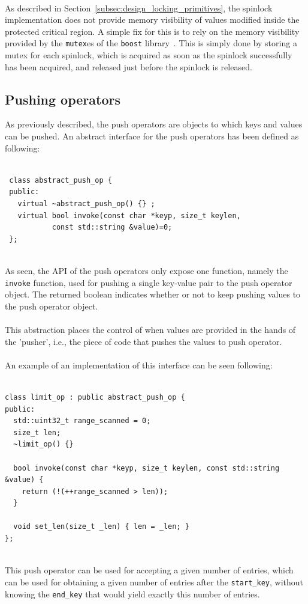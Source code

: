\documentclass[11pt]{report} %
\begin{document}
\\
As described in Section~\ref{subsec:design_locking_primitives}, the spinlock implementation does not provide memory visibility of values modified inside the protected critical region. A simple fix for this is to rely on the memory visibility provided by the \verb|mutex|es of the \verb|boost| library~\cite{boost_mutex}. This is simply done by storing a mutex for each spinlock, which is acquired as soon as the spinlock successfully has been acquired, and released just before the spinlock is released.

\subsection{Pushing operators}
\label{subsec:implementation_pushing_operators}
As previously described, the push operators are objects to which keys and values can be pushed. An abstract interface for the push operators has been defined as following: \\
\\
\begin{fminipage}{\textwidth}
\begin{lstlisting}
 class abstract_push_op {
 public:
   virtual ~abstract_push_op() {} ;
   virtual bool invoke(const char *keyp, size_t keylen,
           const std::string &value)=0;
 };
\end{lstlisting}
\end{fminipage}
\vphantom{fill}\\
As seen, the API of the push operators only expose one function, namely the \verb|invoke| function, used for pushing a single key-value pair to the push operator object. The returned boolean indicates whether or not to keep pushing values to the push operator object. \\
\\
This abstraction places the control of when values are provided in the hands of the 'pusher', i.e., the piece of code that pushes the values to push operator.\\
\\
An example of an implementation of this interface can be seen following:\\
\\
\begin{fminipage}{\textwidth}
\begin{lstlisting}
class limit_op : public abstract_push_op {
public:
  std::uint32_t range_scanned = 0;
  size_t len;
  ~limit_op() {}

  bool invoke(const char *keyp, size_t keylen, const std::string &value) {
    return (!(++range_scanned > len));
  }

  void set_len(size_t _len) { len = _len; }
};
\end{lstlisting}
\end{fminipage}
\vphantom{fill}\\
This push operator can be used for accepting a given number of entries, which can be used for obtaining a given number of entries after the \verb|start_key|, without knowing the \verb|end_key| that would yield exactly this number of entries.
\end{document}
